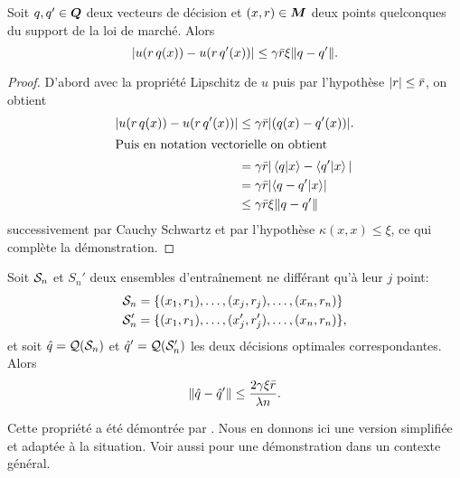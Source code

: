 \begin{lemme}
  \label{lem:sig}
  Soit $q,q' \in \Q$ deux vecteurs de décision et $(x,r) \in \M$ deux points quelconques du
  support de la loi de marché. Alors
  \begin{equation}
    |u(r\,q(x)) - u(r\,q'(x))| \leq \gamma\rmax\xi\|q-q'\|.
  \end{equation}
\end{lemme}

\begin{proof}
  D'abord avec la propriété Lipschitz de $u$ puis par l'hypothèse $|r|\leq\rmax$, on obtient
  \begin{align}
    |u(r\,q(x)) - u(r\,q'(x))| &\leq \gamma\rmax|(q(x) - q'(x))|.\\
    \intertext{Puis en notation vectorielle on obtient}
                               &=\gamma\rmax|\braket{q|x} - \braket{q'|x}|\\
                               &=\gamma\rmax|\langle q-q'|x \rangle|\\
                               &\leq\gamma\rmax\xi\|q-q'\|
  \end{align}
  successivement par Cauchy Schwartz et par l'hypothèse $\kappa(x,x)\leq\xi$, ce qui complète la
  démonstration.
\end{proof}

\begin{lemme}[Stabilité]
  \label{lem:stab}
  Soit $\S_n$ et $S_n'$ deux ensembles d'entraînement ne différant qu'à leur $j$\ieme
  point:
  \begin{align}
    \S_n &= \{(x_1,r_1),\ldots,(x_j,r_j),\ldots,(x_n,r_n)\}\\
    \S_n' &= \{(x_1,r_1),\ldots,(x'_j,r'_j),\ldots,(x_n,r_n)\},
  \end{align}
  et soit $\qh = \alg(\S_n)$ et $\qh' = \alg(\S_n')$ les deux décisions optimales
  correspondantes. Alors
  \begin{equation}
    \|\qh - \qh'\| \leq \frac{2\gamma\xi\rmax}{\lambda n}.
  \end{equation}
\end{lemme}

\begin{rem}
  Cette propriété a été démontrée par \cite{bousquet2002stability}. Nous en donnons ici
  une version simplifiée et adaptée à la situation. Voir aussi \cite{mohri2012foundations}
  pour une démonstration dans un contexte général.
\end{rem}

